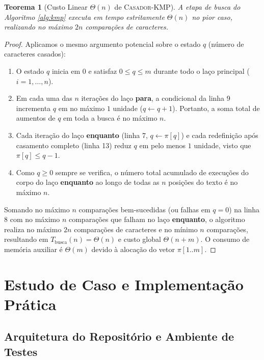 \documentclass[12pt,a4paper]{article}
\newtheorem{teorema}{Teorema}[section]
\begin{document}
\begin{teorema}[Custo Linear $\Theta(n)$ de \textsc{Casador-KMP}]
A etapa de busca do Algoritmo \ref{alg:kmp} executa em tempo estritamente $\Theta(n)$ no pior caso, realizando no m\'aximo $2n$ compara\c{c}\~oes de caracteres.
\end{teorema}
\begin{proof}
Aplicamos o mesmo argumento potencial sobre o estado $q$ (n\'umero de caracteres casados):
\begin{enumerate}
    \item O estado $q$ inicia em $0$ e satisfaz $0 \le q \le m$ durante todo o la\c{c}o principal ($i = 1, \dots, n$).
    \item Em cada uma das $n$ itera\c{c}\~oes do la\c{c}o \textbf{para}, a condicional da linha 9 incrementa $q$ em no m\'aximo $1$ unidade ($q \leftarrow q + 1$). Portanto, a soma total de aumentos de $q$ em toda a busca \'e no m\'aximo $n$.
    \item Cada itera\c{c}\~ao do la\c{c}o \textbf{enquanto} (linha 7, $q \leftarrow \pi[q]$) e cada redefini\c{c}\~ao ap\'os casamento completo (linha 13) reduz $q$ em pelo menos $1$ unidade, visto que $\pi[q] \le q - 1$.
    \item Como $q \ge 0$ sempre se verifica, o n\'umero total acumulado de execu\c{c}\~oes do corpo do la\c{c}o \textbf{enquanto} ao longo de todas as $n$ posi\c{c}\~oes do texto \'e no m\'aximo $n$.
\end{enumerate}
Somando no m\'aximo $n$ compara\c{c}\~oes bem-sucedidas (ou falhas em $q=0$) na linha 8 com no m\'aximo $n$ compara\c{c}\~oes que falham no la\c{c}o \textbf{enquanto}, o algoritmo realiza no m\'aximo $2n$ compara\c{c}\~oes de caracteres e no m\'inimo $n$ compara\c{c}\~oes, resultando em $T_{\text{busca}}(n) = \Theta(n)$ e custo global $\Theta(n + m)$. O consumo de mem\'oria auxiliar \'e $\Theta(m)$ devido \`a aloca\c{c}\~ao do vetor $\pi[1..m]$.
\end{proof}

\section{Estudo de Caso e Implementa\c{c}\~ao Pr\'atica}

\subsection{Arquitetura do Reposit\'orio e Ambiente de Testes}
\end{document}
